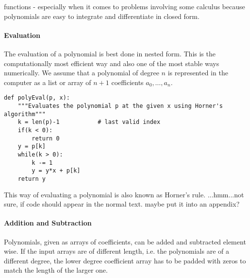 functions - especially when it comes to problems involving some calculus because polynomials are easy to integrate and differentiate in closed form.


\paragraph{Evaluation}
The evaluation of a polynomial is best done in nested form. This is the computationally most efficient way and also one of the most stable ways numerically. We assume that a polynomial of degree $n$ is represented in the computer as a list or array of $n+1$ coefficients $a_0, \ldots, a_n$.
\begin{lstlisting}
def polyEval(p, x):
	"""Evaluates the polynomial p at the given x using Horner's algorithm"""
	k = len(p)-1           # last valid index
	if(k < 0):
		return 0
	y = p[k]
	while(k > 0):
		k -= 1
		y = y*x + p[k]
	return y
\end{lstlisting}
This way of evaluating a polynomial is also known as Horner's rule.
...hmm...not sure, if code should appear in the normal text. maybe put it into an appendix? 


\paragraph{Addition and Subtraction}
Polynomials, given as arrays of coefficients, can be added and subtracted element wise. If the input arrays are of different length, i.e. the polynomials are of a different degree, the lower degree coefficient array has to be padded with zeros to match the length of the larger one.


